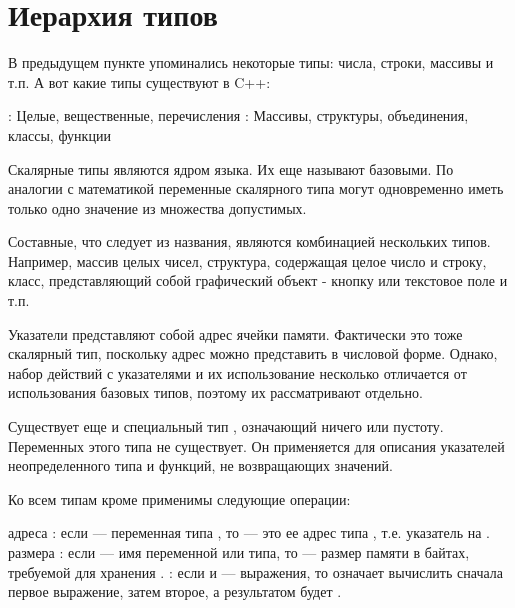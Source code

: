 \documentclass[book.tex]{subfiles}
\begin{document}
\section*{Иерархия типов}

В предыдущем пункте упоминались некоторые типы: числа, строки, массивы и т.п. А вот какие типы существуют в C++:

\begin{itemize}
: Целые, вещественные, перечисления
: Массивы, структуры, объединения, классы, функции
\end{itemize}

Скалярные типы являются ядром языка. Их еще называют базовыми. По аналогии с математикой переменные скалярного типа могут одновременно иметь только одно значение из множества допустимых.

Составные, что следует из названия, являются комбинацией нескольких типов.  Например, массив целых чисел, структура, содержащая целое число и строку, класс, представляющий собой графический объект - кнопку или текстовое поле и т.п.

Указатели представляют собой адрес ячейки памяти. Фактически это тоже скалярный тип, поскольку адрес можно представить в числовой форме. Однако, набор действий с указателями и их использование несколько отличается от использования базовых типов, поэтому их рассматривают отдельно.

Существует еще и специальный тип , означающий ничего или пустоту. Переменных этого типа не существует. Он применяется для описания указателей неопределенного типа и функций, не возвращающих значений.

Ко всем типам кроме  применимы следующие операции:

\begin{itemize}
 адреса \cppword{\&}: если  --- переменная типа , то  --- это ее адрес типа , т.е. указатель на .
 размера : если  --- имя переменной или типа, то  --- размер памяти в байтах, требуемой для хранения .
 \cppword{,}: если  и  --- выражения, то  означает вычислить сначала первое выражение, затем второе, а результатом будет .  
\end{itemize}

\end{document}
